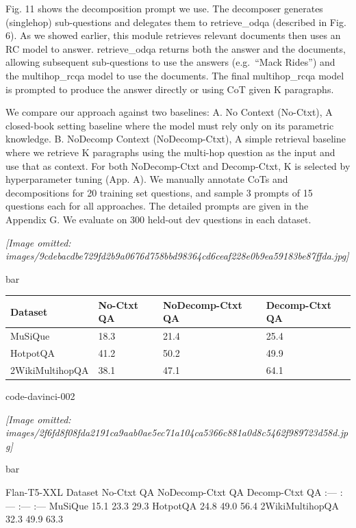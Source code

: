 \documentclass[
]{article}
\newcounter{none} %
\begin{document}
Fig. 11 shows the decomposition prompt we use. The decomposer generates
(singlehop) sub-questions and delegates them to retrieve\_odqa
(described in Fig. 6). As we showed earlier, this module retrieves
relevant documents then uses an RC model to answer. retrieve\_odqa
returns both the answer and the documents, allowing subsequent
sub-questions to use the answers (e.g.~``Mack Rides'') and the
multihop\_rcqa model to use the documents. The final multihop\_rcqa
model is prompted to produce the answer directly or using CoT given K
paragraphs.

We compare our approach against two baselines: A. No Context (No-Ctxt),
A closed-book setting baseline where the model must rely only on its
parametric knowledge. B. NoDecomp Context (NoDecomp-Ctxt), A simple
retrieval baseline where we retrieve K paragraphs using the multi-hop
question as the input and use that as context. For both NoDecomp-Ctxt
and Decomp-Ctxt, K is selected by hyperparameter tuning (App. A). We
manually annotate CoTs and decompositions for 20 training set questions,
and sample 3 prompts of 15 questions each for all approaches. The
detailed prompts are given in the Appendix G. We evaluate on 300
held-out dev questions in each dataset.

\textit{[Image omitted: images/9cdebacdbe729fd2b9a0676d758bbd98364cd6ceaf228e0b9ea59183be87ffda.jpg]}

bar

{\def\LTcaptype{none} %
\begin{longtable}[]{@{}llll@{}}
\toprule\noalign{}
Dataset & No-Ctxt QA & NoDecomp-Ctxt QA & Decomp-Ctxt QA \\
\midrule\noalign{}
\endhead
\bottomrule\noalign{}
\endlastfoot
MuSiQue & 18.3 & 21.4 & 25.4 \\
HotpotQA & 41.2 & 50.2 & 49.9 \\
2WikiMultihopQA & 38.1 & 47.1 & 64.1 \\
\end{longtable}
}

code-davinci-002

\textit{[Image omitted: images/2f6fd8f08fda2191ca9aab0ae5ec71a104ca5366c881a0d8c5462f989723d58d.jpg]}

bar

Flan-T5-XXL \textbar{} Dataset \textbar{} No-Ctxt QA \textbar{}
NoDecomp-Ctxt QA \textbar{} Decomp-Ctxt QA \textbar{} \textbar{} :---
\textbar{} :--- \textbar{} :--- \textbar{} :--- \textbar{} \textbar{}
MuSiQue \textbar{} 15.1 \textbar{} 23.3 \textbar{} 29.3 \textbar{}
\textbar{} HotpotQA \textbar{} 24.8 \textbar{} 49.0 \textbar{} 56.4
\textbar{} \textbar{} 2WikiMultihopQA \textbar{} 32.3 \textbar{} 49.9
\textbar{} 63.3 \textbar{}
\end{document}
